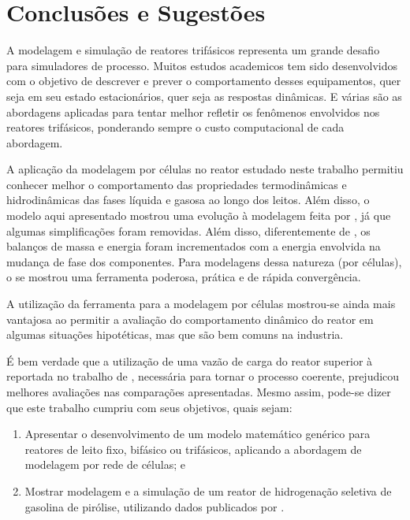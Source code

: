 %
% 
%
\chapter{Conclusões e Sugestões} \label{chap:conclusoes}
%

A modelagem e simulação de reatores trifásicos representa um grande
desafio para simuladores de processo. Muitos estudos academicos tem
sido desenvolvidos com o objetivo de descrever e prever o comportamento desses
equipamentos, quer seja em seu estado estacionários, quer seja as respostas
dinâmicas. E várias são as abordagens aplicadas para tentar melhor refletir os
fenômenos envolvidos nos reatores trifásicos, ponderando sempre o custo
computacional de cada abordagem.

A aplicação da modelagem por células no reator estudado neste trabalho permitiu
conhecer melhor o comportamento das propriedades termodinâmicas e hidrodinâmicas
das fases líquida e gasosa ao longo dos leitos. Além disso, o modelo aqui
apresentado mostrou uma evolução à modelagem feita por ,
já que algumas simplificações foram removidas. Além disso,
diferentemente de , os balanços de massa e energia foram
incrementados com a energia envolvida na mudança de fase dos componentes. Para
modelagens dessa natureza (por células), o \emso{} se mostrou uma ferramenta
poderosa, prática e de rápida convergência.

A utilização da ferramenta \emso{} para a modelagem por células mostrou-se
ainda mais vantajosa ao permitir a avaliação do comportamento dinâmico do reator
em algumas situações hipotéticas, mas que são bem comuns na industria.

É bem verdade que a utilização de uma vazão de carga do reator superior à
reportada no trabalho de , necessária para
tornar o processo coerente, prejudicou melhores avaliações nas comparações
apresentadas. Mesmo assim, pode-se dizer que este trabalho cumpriu
com seus objetivos, quais sejam:

\begin{enumerate}
  \item Apresentar o desenvolvimento de um modelo matemático genérico para
  reatores de leito fixo, bifásico ou trifásicos, aplicando a abordagem de
  modelagem por rede de células; e 
  \item Mostrar modelagem e a simulação de um reator de hidrogenação seletiva
  de gasolina de pirólise, utilizando dados publicados por
  .
\end{enumerate}

